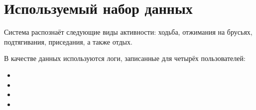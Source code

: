
\section{Используемый набор данных}

Система распознаёт следующие виды активности: ходьба, отжимания на брусьях, подтягивания, приседания, а также отдых.

В качестве данных используются логи, записанные для четырёх пользователей:

\begin{itemize}
\item
\item
\item
\item 
\end{itemize}




